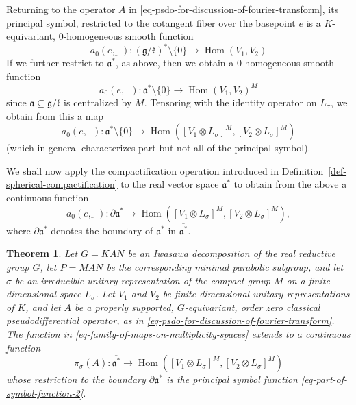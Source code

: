 \documentclass[leqno,11pt]{amsart}
\numberwithin{equation}{subsection}
\theoremstyle{plain}
\newtheorem{theorem}[equation]{Theorem}
\theoremstyle{definition}
\theoremstyle{remark}
\DeclareMathOperator{\Hom}{Hom}
\begin{document}
Returning to the operator $A$ in \eqref{eq-psdo-for-discussion-of-fourier-transform}, its principal symbol, restricted to the cotangent fiber over the basepoint $e$ is a $K$-equivariant, 
$0$-homogeneous smooth function 
\[
a_0 (e,\underbar{\phantom{i}}\,) \colon  (\mathfrak{g}/\mathfrak{k})^* \setminus \{ 0\} \longrightarrow \Hom (V_1,V_2)
\]
If we further restrict to $\mathfrak{a}^*$, as above, then we obtain a $0$-homogeneous smooth function 
\[
a_0 (e,\underbar{\phantom{i}}\,) \colon  \mathfrak{a}^* \setminus \{ 0\} \longrightarrow \Hom (V_1,V_2)^M
\]
since  $\mathfrak{a}\subseteq \mathfrak{g}/\mathfrak{k}$ is centralized by $M$.  Tensoring with the identity operator on $L_\sigma $, we obtain from this a map
\begin{equation}
    \label{eq-part-of-symbol-function}
a_0 (e,\underbar{\phantom{i}}\,) \colon  \mathfrak{a}^* \setminus \{ 0\} \longrightarrow \Hom ([V_1\otimes L_\sigma ]^M,[V_2\otimes L_\sigma ]^M)
\end{equation}
(which in general characterizes part but not all of the principal symbol).

We shall now apply the compactification operation introduced in Definition~\ref{def-spherical-compactification} to   the real vector space $\mathfrak{a}^*$ to obtain from the above a continuous function 
\begin{equation}
    \label{eq-part-of-symbol-function-2}
a_0 (e,\underbar{\phantom{i}}\,) \colon  \partial \mathfrak{a}^* \longrightarrow \Hom ([V_1\otimes L_\sigma ]^M,[V_2\otimes L_\sigma ]^M),
\end{equation}
where $\partial \mathfrak{a}^*$ denotes the boundary of $\mathfrak{a}^*$ in $\overline{\mathfrak{a}^*}$.  

\begin{theorem}
\label{thm-limit-fmla-for-psdo}
Let $G= KAN$ be an Iwasawa decomposition of the real reductive group $G$, let $P=MAN$ be the corresponding minimal parabolic subgroup, and let $\sigma$ be an irreducible unitary representation of the compact group $M$ on a finite-dimensional space $L_\sigma $. Let $V_1$ and $V_2$ be  finite-dimensional unitary representations of $K$, and let $A$ be a properly supported, $G$-equivariant, order zero classical pseudodifferential operator, as in \eqref{eq-psdo-for-discussion-of-fourier-transform}.  The function in  \eqref{eq-family-of-maps-on-multiplicity-spaces}   extends to a continuous function
\[
\pi_\sigma (A) \colon \overline{\mathfrak{a}^*}\longrightarrow \Hom  ([V_1\otimes L_\sigma ]^M,[V_2\otimes L_\sigma ]^M)
\]
whose restriction to  the boundary $\partial \mathfrak{a}^* $ is the principal symbol function \eqref{eq-part-of-symbol-function-2}.
\end{theorem}
\end{document}
